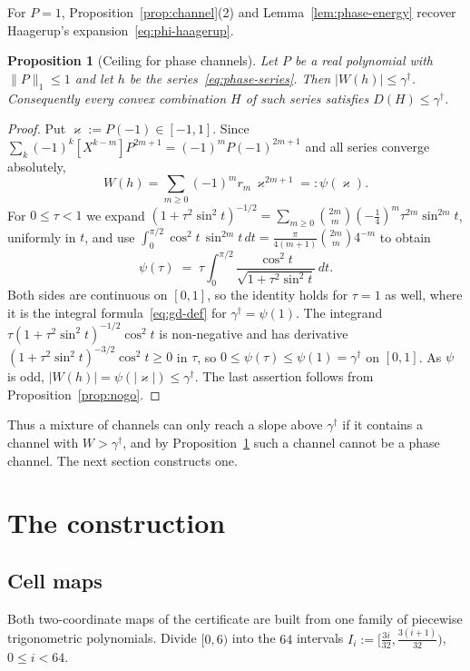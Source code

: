 \documentclass[11pt,reqno]{amsart}
\newtheorem{proposition}[theorem]{Proposition}
\theoremstyle{definition}
\numberwithin{equation}{section}
\newcommand{\gd}{\gamma^\dagger}
\newcommand{\lone}[1]{\|#1\|_1}
\begin{document}
For $P=1$, Proposition~\ref{prop:channel}(2) and Lemma~\ref{lem:phase-energy} recover Haagerup's expansion~\eqref{eq:phi-haagerup}.

\begin{proposition}[Ceiling for phase channels]\label{prop:phase-ceiling}
Let $P$ be a real polynomial with $\lone{P}\le1$ and let $h$ be the series~\eqref{eq:phase-series}. Then $|W(h)|\le\gd$. Consequently every convex combination $H$ of such series satisfies $D(H)\le\gd$.
\end{proposition}

\begin{proof}
Put $\varkappa:=P(-1)\in[-1,1]$. Since $\sum_k(-1)^k[X^{k-m}]P^{2m+1}=(-1)^mP(-1)^{2m+1}$ and all series converge absolutely,
\[
  W(h)=\sum_{m\ge0}(-1)^m r_m\,\varkappa^{2m+1}=:\psi(\varkappa).
\]
For $0\le\tau<1$ we expand $(1+\tau^2\sin^2t)^{-1/2}=\sum_{m\ge0}\binom{2m}{m}(-\tfrac14)^m\tau^{2m}\sin^{2m}t$, uniformly in $t$, and use $\int_0^{\pi/2}\cos^2t\,\sin^{2m}t\,dt=\frac{\pi}{4(m+1)}\binom{2m}{m}4^{-m}$ to obtain
\[
  \psi(\tau)\;=\;\tau\int_0^{\pi/2}\frac{\cos^2t}{\sqrt{1+\tau^2\sin^2t}}\,dt .
\]
Both sides are continuous on $[0,1]$, so the identity holds for $\tau=1$ as well, where it is the integral formula~\eqref{eq:gd-def} for $\gd=\psi(1)$. The integrand $\tau(1+\tau^2\sin^2t)^{-1/2}\cos^2t$ is non-negative and has derivative $(1+\tau^2\sin^2t)^{-3/2}\cos^2t\ge0$ in $\tau$, so $0\le \psi(\tau)\le \psi(1)=\gd$ on $[0,1]$. As $\psi$ is odd, $|W(h)|=\psi(|\varkappa|)\le\gd$. The last assertion follows from Proposition~\ref{prop:nogo}.
\end{proof}

Thus a mixture of channels can only reach a slope above $\gd$ if it contains a channel with $W>\gd$, and by Proposition~\ref{prop:phase-ceiling} such a channel cannot be a phase channel. The next section constructs one.

\section{The construction}\label{sec:construction}

\subsection{Cell maps}\label{sec:cellmaps}
Both two-coordinate maps of the certificate are built from one family of piecewise trigonometric polynomials. Divide $[0,6)$ into the $64$ intervals $I_i := [\frac{3i}{32}, \frac{3(i+1)}{32})$, $0 \le i < 64$.
\end{document}
